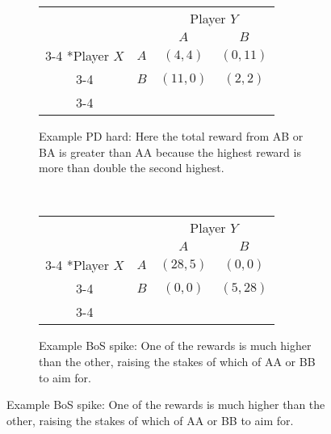 \documentclass{article}
\begin{document}
\begin{figure}
		\bigskip
		\bigskip
			\begin{subfigure}[b]{0.45\textwidth}
			\caption{Example PD hard: Here the total reward from AB or BA is greater than AA because the highest reward is more than double the second highest.}
			\label{payoff-PDhard}
			\begin{tabular}{cc|c|c|}
				& \multicolumn{1}{c}{} & \multicolumn{2}{c}{Player $Y$}\\
				& \multicolumn{1}{c}{} & \multicolumn{1}{c}{$A$}  & \multicolumn{1}{c}{$B$} \\\cline{3-4}
				\multirow{2}*{Player $X$}  & $A$ & $(4,4)$ & $(0,11)$ \\\cline{3-4}
				& $B$ & $(11,0)$ & $(2,2)$ \\\cline{3-4}
			\end{tabular}
		\end{subfigure}
		~~~~
				\begin{subfigure}[b]{0.45\textwidth}
			\caption{Example BoS spike: One of the rewards is much higher than the other, raising the stakes of which of AA or BB to aim for. }
			\label{payoff-BoSspike}
			\begin{tabular}{cc|c|c|}
				& \multicolumn{1}{c}{} & \multicolumn{2}{c}{Player $Y$}\\
				& \multicolumn{1}{c}{} & \multicolumn{1}{c}{$A$}  & \multicolumn{1}{c}{$B$} \\\cline{3-4}
				\multirow{2}*{Player $X$}  & $A$ & $(28,5)$ & $(0,0)$ \\\cline{3-4}
				& $B$ & $(0,0)$ & $(5,28)$ \\\cline{3-4}
			\end{tabular}
		\end{subfigure}
		
		\end{figure}
		
							
\end{document}
